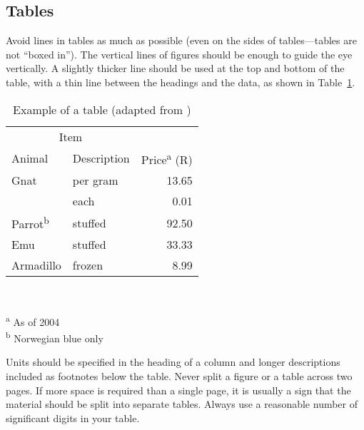 \documentclass[a5paper, 10pt]{article}
\begin{document}
\subsection{Tables}
Avoid lines in tables as much as possible (even on the sides
of tables---tables are not ``boxed in'').  The vertical
lines of figures should be enough to guide the eye vertically.  A
slightly thicker line should be used at the top and bottom of the
table, with a thin line between the headings and the data, as shown in
Table~\ref{tab:tabexample}.

\begin{table}[htbp]
  \centering
  \caption{Example of a table (adapted from \citet{fear})}
  \label{tab:tabexample}
  \begin{minipage}{0.5\textwidth}
    \begin{centering}
      \begin{tabular}{@{}llr@{}} \toprule 
        \multicolumn{2}{c}{Item}                                               \\ 
        \cmidrule(r){1-2} 
        Animal                    & Description & Price\textsuperscript{a} (R) \\ 
        \midrule 
        Gnat                      & per gram    & \num{13.65}                  \\ 
                                  & each        & \num{0.01}                   \\ 
        Parrot\textsuperscript{b} & stuffed     & \num{92.50}                  \\ 
        Emu                       & stuffed     & \num{33.33}                  \\ 
        Armadillo                 & frozen      & \num{8.99}                   \\ 
        \bottomrule 
      \end{tabular}                                                            \\
    \end{centering} 
    \vspace{1em}
    \textsuperscript{a} As of 2004                                             \\
    \textsuperscript{b} Norwegian blue only
  \end{minipage}
\end{table}

Units should be specified in the heading of a column and longer descriptions included as footnotes below the table.
Never split a figure or a table across two pages.
If more space is required than a single page, it is usually a sign that the material should be split into separate tables.
Always use a reasonable number of significant digits in your table.
\end{document}
